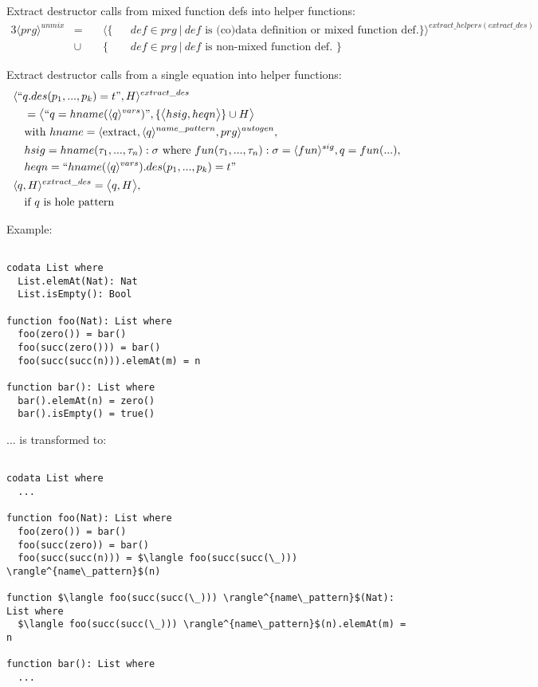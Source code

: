 \documentclass[11pt]{article} %
\begin{document}
Extract destructor calls from mixed function defs into helper functions:
\begin{alignat*}{3}
\langle prg \rangle^{unmix} & = ~&& \langle \{ && def \in prg ~ | ~ def \textrm{ is (co)data definition or mixed function def.} \} \rangle^{extract\_helpers(extract\_des)} \\
&\cup && \{ && def \in prg ~ | ~ def \textrm{ is non-mixed function def. } \}
\end{alignat*}

Extract destructor calls from a single equation into helper functions:
\begin{alignat*}{2}
& \langle `` q.des(p_1, ..., p_k) = t ", H \rangle^{extract\_des} \span\span \\
&\quad = \big\langle `` q = hname(\langle q \rangle^{vars})  ", \{\big\langle hsig, heqn \big\rangle\} \cup H \big\rangle \\
&\quad \textrm{with } hname = \langle \textrm{extract}, \langle q \rangle^{name\_pattern}, prg \rangle^{autogen}, \\
&\quad hsig = hname(\tau_1, ..., \tau_n): \sigma \textrm{ where } fun(\tau_1, ..., \tau_n): \sigma = \langle fun \rangle^{sig}, q = fun(...), \span\span \\
&\quad heqn = `` hname(\langle q \rangle^{vars}).des(p_1, ..., p_k) = t  " \span\span \\
& \langle q, H \rangle^{extract\_des} = \big\langle q, H \big\rangle, \span\span \\
&\quad \textrm{if $q$ is hole pattern} \span\span
\end{alignat*}

Example:

\begin{lstlisting}  

codata List where
  List.elemAt(Nat): Nat
  List.isEmpty(): Bool

function foo(Nat): List where
  foo(zero()) = bar()
  foo(succ(zero())) = bar()
  foo(succ(succ(n))).elemAt(m) = n

function bar(): List where
  bar().elemAt(n) = zero()
  bar().isEmpty() = true()

\end{lstlisting}

... is transformed to:

\begin{lstlisting}[mathescape]

codata List where
  ...

function foo(Nat): List where
  foo(zero()) = bar()
  foo(succ(zero)) = bar()
  foo(succ(succ(n))) = $\langle foo(succ(succ(\_))) \rangle^{name\_pattern}$(n)

function $\langle foo(succ(succ(\_))) \rangle^{name\_pattern}$(Nat): List where
  $\langle foo(succ(succ(\_))) \rangle^{name\_pattern}$(n).elemAt(m) = n

function bar(): List where
  ...

\end{lstlisting}
\end{document}

